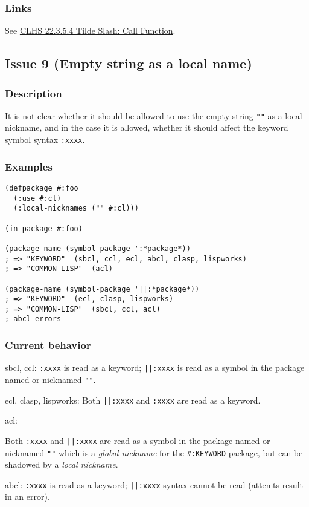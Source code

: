 \documentclass[11pt]{article}
\begin{document}
\subsubsection{Links}
\label{sec:org8738b3d}
See \href{https://www.lispworks.com/documentation/HyperSpec/Body/22\_ced.htm}{CLHS 22.3.5.4 Tilde Slash: Call Function}.
\subsection{Issue 9 (Empty string as a local name)}
\label{sec:org04a331d}
\subsubsection{Description}
\label{sec:org9054330}
It is not clear whether it should be allowed to use the empty string \texttt{""} as a
local nickname, and in the case it is allowed, whether it should affect the
keyword symbol syntax \texttt{:xxxx}.
\subsubsection{Examples}
\label{sec:org953f274}
\begin{verbatim}
(defpackage #:foo
  (:use #:cl)
  (:local-nicknames ("" #:cl)))

(in-package #:foo)

(package-name (symbol-package ':*package*))
; => "KEYWORD"  (sbcl, ccl, ecl, abcl, clasp, lispworks)
; => "COMMON-LISP"  (acl)

(package-name (symbol-package '||:*package*))
; => "KEYWORD"  (ecl, clasp, lispworks)
; => "COMMON-LISP"  (sbcl, ccl, acl)
; abcl errors
\end{verbatim}
\subsubsection{Current behavior}
\label{sec:org5cb2c3b}
sbcl, ccl:
\texttt{:xxxx} is read as a keyword;
\texttt{||:xxxx} is read as a symbol in the package named or nicknamed \texttt{""}.

ecl, clasp, lispworks:
Both \texttt{||:xxxx} and \texttt{:xxxx} are read as a keyword.

acl:

Both \texttt{:xxxx} and \texttt{||:xxxx} are read as a symbol in the package named or nicknamed
\texttt{""} which is a \emph{global nickname} for the \texttt{\#:KEYWORD} package, but can be shadowed
by a \emph{local nickname}.

abcl:
\texttt{:xxxx} is read as a keyword;
\texttt{||:xxxx} syntax cannot be read (attemts result in an error).
\end{document}
